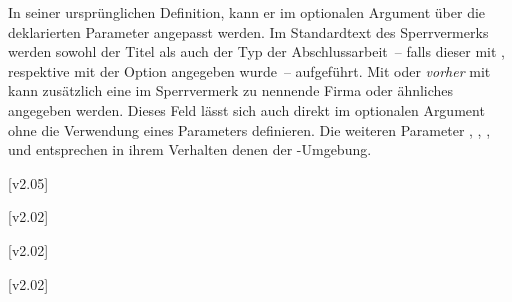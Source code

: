 \begin{DeclareEntity*}{}
\begin{DeclareEntity*}{}
\begin{DeclareEntity*}{}
\begin{Declaration}
\begin{Declaration}
\begin{Declaration}
\begin{Declaration}
\begin{Declaration}
\begin{Declaration}
\begin{Declaration}
In seiner ursprünglichen Definition, kann er im optionalen Argument über die 
deklarierten Parameter angepasst werden. Im Standardtext des Sperrvermerks 
werden sowohl der Titel als auch der Typ der Abschlussarbeit~-- falls dieser 
mit , 
respektive mit der Option  angegeben wurde~-- aufgeführt. 
Mit  oder \emph{vorher} mit  kann 
zusätzlich eine im Sperrvermerk zu nennende Firma oder ähnliches angegeben 
werden. Dieses Feld lässt sich auch direkt im optionalen Argument ohne die 
Verwendung eines Parameters definieren. Die weiteren Parameter 
, 
, 
, 
 und 
 entsprechen in ihrem Verhalten denen 
der -Umgebung.
\end{Declaration}
\end{Declaration}
\end{Declaration}
\end{Declaration}
\end{Declaration}
\end{Declaration}
\end{Declaration}

\begin{Declaration}
  {}
\begin{Declaration}
  {}
  [v2.05]
\begin{Declaration}
  {}
\begin{Declaration}
  {}
  [v2.02]
\begin{Declaration}
  {}
  [v2.02]
\begin{Declaration}
  {}
  [v2.02]
\begin{Declaration}
  {}
\begin{Declaration}
  {}
\begin{Declaration}
  {}
\begin{Declaration}
  {}
\begin{Declaration}
  {}
\printdeclarationlist


\end{Declaration}
\end{Declaration}
\end{Declaration}
\end{Declaration}
\end{Declaration}
\end{Declaration}
\end{Declaration}
\end{Declaration}
\end{Declaration}
\end{Declaration}
\end{Declaration}
\end{DeclareEntity*}
\end{DeclareEntity*}
\end{DeclareEntity*}
